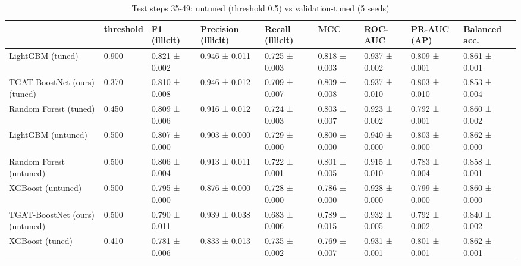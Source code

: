 \begin{table}
\caption{Test steps 35-49: untuned (threshold 0.5) vs validation-tuned (5 seeds)}
\label{tab:04_tuned_vs_untuned}
\begin{tabular}{lllllllll}
\toprule
 & threshold & F1 (illicit) & Precision (illicit) & Recall (illicit) & MCC & ROC-AUC & PR-AUC (AP) & Balanced acc. \\
\midrule
LightGBM (tuned) & 0.900 & 0.821 ± 0.002 & 0.946 ± 0.011 & 0.725 ± 0.003 & 0.818 ± 0.003 & 0.937 ± 0.002 & 0.809 ± 0.001 & 0.861 ± 0.001 \\
TGAT-BoostNet (ours) (tuned) & 0.370 & 0.810 ± 0.008 & 0.946 ± 0.012 & 0.709 ± 0.007 & 0.809 ± 0.008 & 0.937 ± 0.010 & 0.803 ± 0.010 & 0.853 ± 0.004 \\
Random Forest (tuned) & 0.450 & 0.809 ± 0.006 & 0.916 ± 0.012 & 0.724 ± 0.003 & 0.803 ± 0.007 & 0.923 ± 0.002 & 0.792 ± 0.001 & 0.860 ± 0.002 \\
LightGBM (untuned) & 0.500 & 0.807 ± 0.000 & 0.903 ± 0.000 & 0.729 ± 0.000 & 0.800 ± 0.000 & 0.940 ± 0.000 & 0.803 ± 0.000 & 0.862 ± 0.000 \\
Random Forest (untuned) & 0.500 & 0.806 ± 0.004 & 0.913 ± 0.011 & 0.722 ± 0.001 & 0.801 ± 0.005 & 0.915 ± 0.010 & 0.783 ± 0.004 & 0.858 ± 0.001 \\
XGBoost (untuned) & 0.500 & 0.795 ± 0.000 & 0.876 ± 0.000 & 0.728 ± 0.000 & 0.786 ± 0.000 & 0.928 ± 0.000 & 0.799 ± 0.000 & 0.860 ± 0.000 \\
TGAT-BoostNet (ours) (untuned) & 0.500 & 0.790 ± 0.011 & 0.939 ± 0.038 & 0.683 ± 0.006 & 0.789 ± 0.015 & 0.932 ± 0.005 & 0.792 ± 0.002 & 0.840 ± 0.002 \\
XGBoost (tuned) & 0.410 & 0.781 ± 0.006 & 0.833 ± 0.013 & 0.735 ± 0.002 & 0.769 ± 0.007 & 0.931 ± 0.001 & 0.801 ± 0.001 & 0.862 ± 0.001 \\
\bottomrule
\end{tabular}
\end{table}
